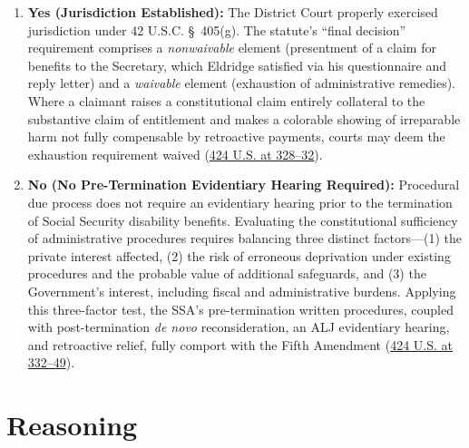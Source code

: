 \documentclass[12pt]{article}
\begin{document}
\begin{enumerate}
    \item \textbf{Yes (Jurisdiction Established):} The District Court properly exercised jurisdiction under 42 U.S.C. \S~405(g). The statute's ``final decision'' requirement comprises a \emph{nonwaivable} element (presentment of a claim for benefits to the Secretary, which Eldridge satisfied via his questionnaire and reply letter) and a \emph{waivable} element (exhaustion of administrative remedies). Where a claimant raises a constitutional claim entirely collateral to the substantive claim of entitlement and makes a colorable showing of irreparable harm not fully compensable by retroactive payments, courts may deem the exhaustion requirement waived (\href{https://supreme.justia.com/cases/federal/us/424/319/}{424 U.S. at 328--32}).
    \item \textbf{No (No Pre-Termination Evidentiary Hearing Required):} Procedural due process does not require an evidentiary hearing prior to the termination of Social Security disability benefits. Evaluating the constitutional sufficiency of administrative procedures requires balancing three distinct factors---(1) the private interest affected, (2) the risk of erroneous deprivation under existing procedures and the probable value of additional safeguards, and (3) the Government's interest, including fiscal and administrative burdens. Applying this three-factor test, the SSA's pre-termination written procedures, coupled with post-termination \emph{de novo} reconsideration, an ALJ evidentiary hearing, and retroactive relief, fully comport with the Fifth Amendment (\href{https://supreme.justia.com/cases/federal/us/424/319/}{424 U.S. at 332--49}).
\end{enumerate}

\section{Reasoning}
\end{document}
